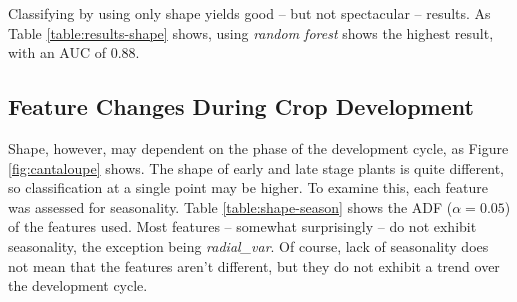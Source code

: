 \documentclass[letterpaper]{report}
\begin{document}
Classifying by using only shape yields good -- but not spectacular -- results. As Table \ref{table:results-shape} shows, using \textit{random forest} shows the highest result, with an AUC of 0.88. 

{
\renewcommand{\arraystretch}{0.9}

}

\subsection{Feature Changes During Crop Development}
Shape, however, may dependent on the phase of the development cycle, as Figure \ref{fig:cantaloupe} shows. The shape of early and late stage plants is quite different, so classification at a single point may be higher.  To examine this, each feature was assessed for seasonality. Table \ref{table:shape-season} shows the ADF ($\alpha = 0.05$) of the features used.  Most features -- somewhat surprisingly -- do not exhibit seasonality, the exception being \textit{radial\_var}. Of course, lack of seasonality does not mean that the features aren't different, but they do not exhibit a trend over the development cycle.

{
\renewcommand{\arraystretch}{0.9}

}
\end{document}
